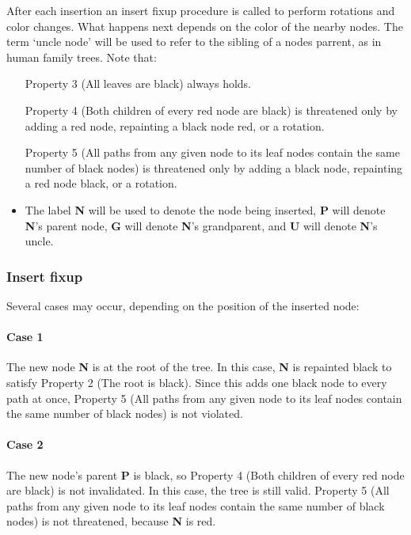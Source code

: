 \documentclass{article}
\newcommand{\inlinecode}[1]{\textit{#1}}
\begin{document}
After each insertion an insert fixup procedure is called to perform rotations and color changes. What happens next depends on the color of the nearby nodes. The term `uncle node' will be used to refer to the sibling of a nodes parrent, as in human family trees. Note that:
\begin{itemize}
\item[Property 3](All leaves are black) always holds.
\item[Property 4](Both children of every red node are black) is threatened only by adding a red node, repainting a black node red, or a rotation.
\item[Property 5](All paths from any given node to its leaf nodes contain the same number of black nodes) is threatened only by adding a black node, repainting a red node black, or a rotation.
\item The label \textbf{N} will be used to denote the node being inserted, \textbf{P} will denote \textbf{N}'s parent node, \textbf{G} will denote \textbf{N}'s grandparent, and \textbf{U} will denote \textbf{N}'s uncle.
\end{itemize}

\subsubsection[\inlinecode{rb-insFixup}]{Insert fixup}
Several cases may occur, depending on the position of the inserted node:
\paragraph{Case 1}
The new node \textbf{N} is at the root of the tree. In this case, \textbf{N} is repainted black to satisfy Property 2 (The root is black). Since this adds one black node to every path at once, Property 5 (All paths from any given node to its leaf nodes contain the same number of black nodes) is not violated.
\paragraph{Case 2}
The new node's parent \textbf{P} is black, so Property 4 (Both children of every red node are black) is not invalidated. In this case, the tree is still valid. Property 5 (All paths from any given node to its leaf nodes contain the same number of black nodes) is not threatened, because \textbf{N} is red.
\end{document}
